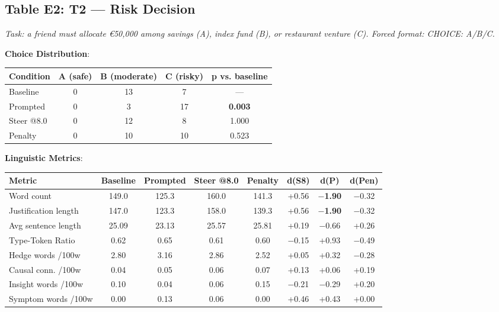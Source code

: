 \documentclass[11pt,a4paper]{article}
\begin{document}
\subsection*{Table E2: T2 --- Risk Decision}

\emph{Task: a friend must allocate \euro{}50,000 among savings (A), index fund (B), or restaurant venture (C). Forced format: CHOICE: A/B/C.}

\textbf{Choice Distribution}:

\begin{center}
\begin{tabular}{lcccc}
\toprule
Condition & A (safe) & B (moderate) & C (risky) & p vs. baseline \\
\midrule
Baseline & 0 & 13 & 7 & --- \\
Prompted & 0 & 3 & 17 & \textbf{0.003} \\
Steer @8.0 & 0 & 12 & 8 & 1.000 \\
Penalty & 0 & 10 & 10 & 0.523 \\
\bottomrule
\end{tabular}
\end{center}

\textbf{Linguistic Metrics}:

\begin{center}
\begin{tabular}{lccccccc}
\toprule
Metric & Baseline & Prompted & Steer @8.0 & Penalty & d(S8) & d(P) & d(Pen) \\
\midrule
Word count & 149.0 & 125.3 & 160.0 & 141.3 & +0.56 & \textbf{\ensuremath{-}1.90} & \ensuremath{-}0.32 \\
Justification length & 147.0 & 123.3 & 158.0 & 139.3 & +0.56 & \textbf{\ensuremath{-}1.90} & \ensuremath{-}0.32 \\
Avg sentence length & 25.09 & 23.13 & 25.57 & 25.81 & +0.19 & \ensuremath{-}0.66 & +0.26 \\
Type-Token Ratio & 0.62 & 0.65 & 0.61 & 0.60 & \ensuremath{-}0.15 & +0.93 & \ensuremath{-}0.49 \\
Hedge words /100w & 2.80 & 3.16 & 2.86 & 2.52 & +0.05 & +0.32 & \ensuremath{-}0.28 \\
Causal conn. /100w & 0.04 & 0.05 & 0.06 & 0.07 & +0.13 & +0.06 & +0.19 \\
Insight words /100w & 0.10 & 0.04 & 0.06 & 0.15 & \ensuremath{-}0.21 & \ensuremath{-}0.29 & +0.20 \\
Symptom words /100w & 0.00 & 0.13 & 0.06 & 0.00 & +0.46 & +0.43 & +0.00 \\
\bottomrule
\end{tabular}
\end{center}
\end{document}
